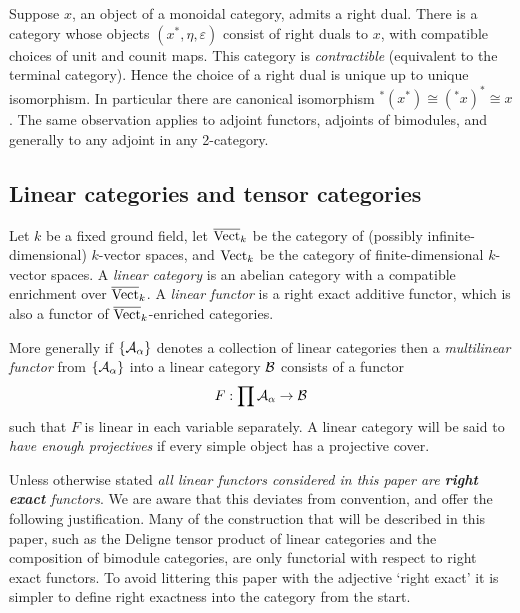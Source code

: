 \documentclass{amsart}
\begin{document}
\begin{remark}
	Suppose $x$, an object of a monoidal category, admits a right dual.  There is a category whose objects $(x^*, \eta, \varepsilon)$ consist of right duals to $x$, with compatible choices of unit and counit maps. This category is {\em contractible} (equivalent to the terminal category). Hence the choice of a right dual is unique up to unique isomorphism. In particular there are canonical isomorphism ${}^*(x^*) \cong ({}^*x)^* \cong x$. 
The same observation applies to adjoint functors, adjoints of bimodules, and generally to any adjoint in any 2-category.  
\end{remark}



\subsection{Linear categories and tensor categories} \label{sec-tc-lincat}

	Let $k$ be a fixed ground field, let $\overline{\mathrm{Vect}}_k$ be the category of (possibly infinite-dimensional) $k$-vector spaces, and $\mathrm{Vect}_k$ be the category of finite-dimensional $k$-vector spaces.   A {\em linear category} is an abelian category with a compatible enrichment over $\overline{\mathrm{Vect}}_k$. 
A {\em linear functor} is a right exact additive functor, which is also a functor of $\overline{\mathrm{Vect}}_k$-enriched categories. 
	
More generally if $\{\mathcal A_\alpha\}$ denotes a collection of linear categories then a {\em multilinear functor} from $\{\mathcal A_\alpha\}$ into a linear category $\mathcal B$ consists of a functor
\begin{equation*}
	F: \prod \mathcal A_\alpha \to \mathcal B
\end{equation*}
such that $F$ is linear in each variable separately. A linear category will be said to {\em have enough projectives} if every simple object has a projective cover. 

\begin{warning}
	Unless otherwise stated {\em all linear functors considered in this paper are {\bf right exact} functors}.  We are aware that this deviates from convention, and offer the following justification. Many of the construction that will be described in this paper, such as the Deligne tensor product of linear categories and the composition of bimodule categories, are only functorial with respect to right exact functors. To avoid littering this paper with the adjective `right exact' it is simpler to define right exactness into the category from the start.  
\end{warning}
\end{document}
